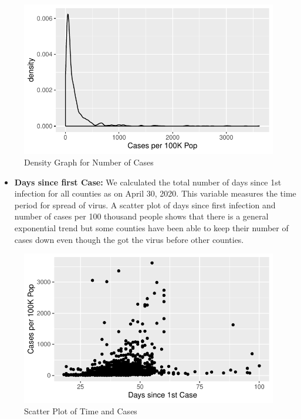 \documentclass[
]{article}
\providecommand{\tightlist}{%
  \setlength{\itemsep}{0pt}\setlength{\parskip}{0pt}}
\begin{document}
\begin{figure}
\centering
\includegraphics{covid_tree_analysis_files/figure-latex/unnamed-chunk-3-1.pdf}
\caption{Density Graph for Number of Cases}
\end{figure}

\begin{itemize}
\tightlist
\item
  \textbf{Days since first Case:} We calculated the total number of days
  since 1st infection for all counties as on April 30, 2020. This
  variable measures the time period for spread of virus. A scatter plot
  of days since first infection and number of cases per 100 thousand
  people shows that there is a general exponential trend but some
  counties have been able to keep their number of cases down even though
  the got the virus before other counties.
\end{itemize}

\begin{figure}
\centering
\includegraphics{covid_tree_analysis_files/figure-latex/unnamed-chunk-4-1.pdf}
\caption{Scatter Plot of Time and Cases}
\end{figure}
\end{document}
